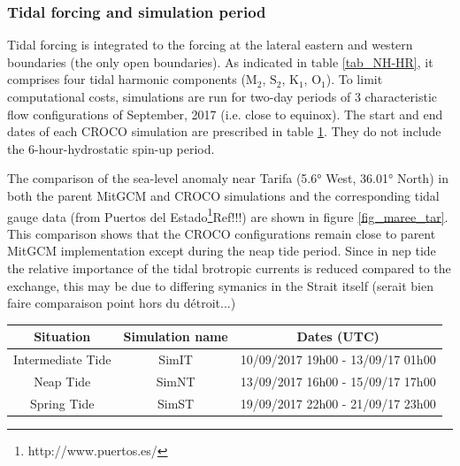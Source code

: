 \subsubsection{Tidal forcing and simulation period}
Tidal forcing is integrated to the forcing at the lateral eastern and western boundaries (the only open boundaries). As indicated in table \ref{tab_NH-HR}, it comprises four tidal harmonic components ($\text{M}_{\text{2}}$, $\text{S}_{\text{2}}$, $\text{K}_{\text{1}}$, $\text{O}_{\text{1}}$). To limit computational costs, simulations are run for two-day periods of 3 characteristic flow configurations of September, 2017 (i.e. close to equinox). The start and end dates of each CROCO simulation are prescribed in table \ref{tab_dates_MIV}. They do not include the 6-hour-hydrostatic spin-up period.

The comparison of the sea-level anomaly near Tarifa (5.6° West, 36.01° North) in both the parent MitGCM and CROCO simulations and the corresponding tidal gauge data (from Puertos del Estado\color{red}\footnote{http://www.puertos.es/}Ref!!!\color{black}) are shown in figure \ref{fig_maree_tar}. \color{blue} This comparison shows that the CROCO configurations remain close to parent MitGCM implementation except during the neap tide period. \color{red}Since in nep tide the relative importance of the tidal brotropic currents is reduced compared to the exchange, this may be due to differing symanics in the Strait itself (serait bien faire comparaison point hors du détroit...) \color{black}

\begin{table}[h]
        \centering
        \begin{tabular}{|c|c|c|}
                \hline
                Situation & Simulation name & Dates (UTC)\\
                \hline
                Intermediate Tide & SimIT & 10/09/2017 19h00 - 13/09/17 01h00  \\
                Neap Tide & SimNT & 13/09/2017 16h00 - 15/09/17 17h00 \\
                Spring Tide & SimST & 19/09/2017 22h00 - 21/09/17 23h00  \\
                \hline
        \end{tabular}
        \label{tab_dates_MIV}
\end{table}

